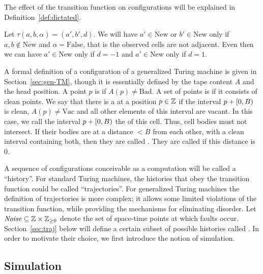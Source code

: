 \documentclass[11pt]{memoir}
\theoremstyle{definition} %
\renewcommand{\ge}{\geq}
\def\B{B}
\newcommand{\Noise}{\mathit{Noise}}
\newcommand{\Bad}{\mathrm{Bad}}
\newcommand{\Vacant}{\mathrm{Vac}}
\newcommand{\New}{\mathrm{New}}
\newcommand{\False}{\mathrm{False}}
\begin{document}
The effect of the transition function on configurations will be explained in
Definition~\ref{def:dictated}.

\begin{remark}\label{rem:New}
Let \( \tau(a,b,\alpha) = (a',b',d) \).
 We will have \( a'\in\New \) or \( b'\in\New \) only if \( a,b\not\in\New \) and \( \alpha=\False \),
that is the observed cells are not adjacent.
Even then we can have \( a'\in\New \) only if \( d=-1 \) and \( a'\in\New \) only if \( d=1 \).   
\end{remark}

A formal definition of a configuration of a generalized Turing machine is given in
Section~\ref{sec:gen-TM}, though it is essentially defined by the tape content \( A \) and the head
position.
A point \( p \) is  if  \( A(p)\ne\Bad \).
A set of points is  if it consists of clean points.
We say that there is a  at a position \( p\in\mathbb{Z} \) if the interval
\( p+\lint{0}{\B} \) is clean, \( A(p)\ne \Vacant \) and all other elements of this interval are vacant.
In this case, we call the interval \( p+\lint{0}{\B} \) the  of this cell.
Thus, cell bodies must not intersect.
If their bodies are at a distance \( <\B \) from each
other, with a clean interval containing both, then they are called .
They are called  if this distance is \( 0 \).

A sequence of configurations conceivable as a computation will be called a ``history''.
For standard Turing machines, 
the histories that obey the transition function could be called ``trajectories''.
For generalized Turing machines the definition of trajectories is more complex; it
allows some limited violations of the transition function, while providing the mechanisms
for eliminating disorder.
Let \(    \Noise\subseteq \bbZ\times\bbZ_{\ge 0} \)
denote the set of space-time points at which faults occur.
Section~\ref{sec:traj} below will define a certain subset of possible histories
called .
In order to motivate their choice, we first introduce the notion of simulation.

 \subsection{Simulation}\label{sec:sim}
\end{document}
